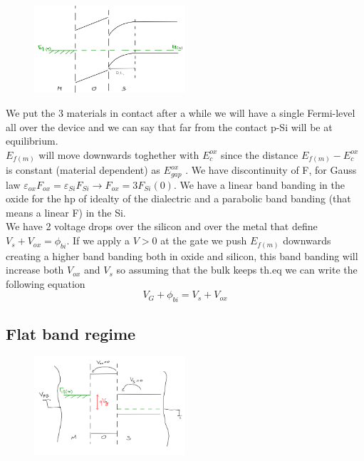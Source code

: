\begin{figure}
\includegraphics[width=0.5\textwidth]{mos_theq.png}
\end{figure}

We put the 3 materials in contact after a while we will have a single Fermi-level all over the device and we can say that far from the contact p-Si will be at equilibrium.\\
$E_{f(m)}$ will move downwards toghether with $E_c^{ox}$ since the distance $E_{f(m)}-E_c^{ox}$ is constant (material dependent) as $E_{gap}^{ox}$ .
We have discontinuity of F, for Gauss law $\varepsilon_{ox}F_{ox}=\varepsilon_{Si}F_{Si}\rightarrow F_{ox}=3F_{Si}(0)$. We have a linear band banding in the oxide for the hp of idealty of the dialectric and a parabolic band banding (that means a linear F) in the Si.\\
We have 2 voltage drops over the silicon and over the metal that define $V_s+V_{ox}=\phi_{bi}$.
If we apply a $V>0$ at the gate we push $E_{f(m)}$ downwards creating a higher band banding both in oxide and silicon, this band banding will increase both $V_{ox}$ and $V_{s}$ so assuming that the bulk keeps th.eq we can write the following equation
\begin{equation}
V_{G}+\phi_{bi}=V_s+V_{ox}
\end{equation}
\subsection{Flat band regime}
\begin{figure}
\includegraphics[width=0.5\textwidth]{mos_vfb.png}
\end{figure}

